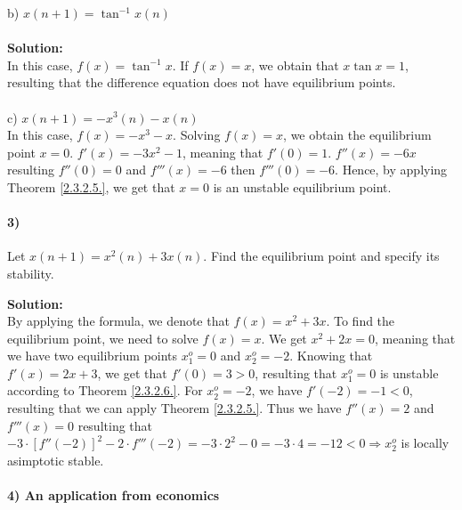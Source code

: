 \documentclass[a4paper, 11pt]{report}
\begin{document}
b) $x(n+1)=\tan^{-1}{x(n)}$ \\ \\
\textbf{Solution:}\\

In this case, $f(x)=\tan^{-1}{x}$. If $f(x)=x$, we obtain that $x\tan{x}=1$, resulting that the difference equation does not have equilibrium points. \\ \\
c) $x(n+1)=-x^{3}(n)-x(n)$\\
In this case, $f(x)=-x^{3}-x$. Solving $f(x)=x$, we obtain the equilibrium point $x=0$. $f'(x)=-3x^{2}-1$, meaning that $f'(0)=1$. $f''(x)=-6x$ resulting $f''(0)=0$ and $f'''(x)=-6$ then $f'''(0)=-6$. Hence, by applying Theorem \ref{2.3.2.5.}, we get that $x=0$ is an unstable equilibrium point. 

\paragraph{3)} Let $x(n+1)=x^{2}(n)+3x(n)$. Find the equilibrium point and specify its stability.

\textbf{Solution:}\\
By applying the formula, we denote that $f(x)=x^{2}+3x$. To find the equilibrium point, we need to solve $f(x)=x$. We get $x^{2}+2x=0$, meaning that we have two equilibrium points $x^{o}_{1}=0$ and $x_{2}^{o}=-2$. Knowing that $f'(x)=2x+3$, we get that $f'(0)=3>0$, resulting that $x_{1}^{o}=0$ is unstable according to Theorem \ref{2.3.2.6.}. For $x_{2}^{o}=-2$, we have $f'(-2)=-1<0$, resulting that we can apply Theorem \ref{2.3.2.5.}. Thus we have $f''(x)=2$ and $f'''(x)=0$ resulting that $-3\cdot [f''(-2)]^{2}-2\cdot f'''(-2)=-3\cdot 2^{2}-0=-3\cdot 4=-12<0 \Rightarrow x_{2}^{o}$ is locally asimptotic stable. 

\paragraph{4) An application from economics}
\end{document}

